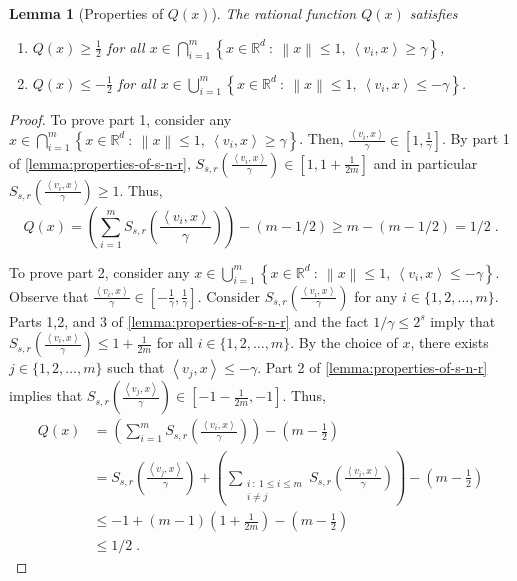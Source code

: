 \documentclass[12pt]{article}
\newtheorem{lemma}[definition]{Lemma}
\newcommand{\R}{\mathbb{R}}  %
\newcommand{\ip}[2]{\left\langle #1, #2 \right\rangle} %
\newcommand{\norm}[1]{\left\| #1 \right\|}  %
\begin{document}
\begin{lemma}[Properties of $Q(x)$]
\label{lemma:properties-of-q}
The rational function $Q(x)$ satisfies
\begin{enumerate}
\item $Q(x) \ge \frac{1}{2}$ for all $\displaystyle x \in \bigcap_{i=1}^m \left\{ x \in \R^d ~:~ \norm{x} \le 1, \ \ip{v_i}{x} \ge \gamma \right\}$,
\item $Q(x) \le -\frac{1}{2}$ for all $\displaystyle x \in \bigcup_{i=1}^m \left\{ x \in \R^d ~:~ \norm{x} \le 1, \ \ip{v_i}{x} \le - \gamma \right\}$.
\end{enumerate}
\end{lemma}

\begin{proof}
To prove part 1, consider any $x \in \bigcap_{i=1}^m \left\{ x \in \R^d ~:~ \norm{x} \le 1, \
\ip{v_i}{x} \ge \gamma \right\}$. Then, $\frac{\ip{v_i}{x}}{\gamma} \in [1,
\frac{1}{\gamma}]$. By part 1 of \autoref{lemma:properties-of-s-n-r},
$S_{s,r}\left(\frac{\ip{v_i}{x}}{\gamma}\right) \in [1, 1 + \frac{1}{2m}]$ and
in particular $S_{s,r}\left(\frac{\ip{v_i}{x}}{\gamma}\right) \ge 1$. Thus,
$$
Q(x) = \left( \sum_{i=1}^m S_{s,r}\left(\frac{\ip{v_i}{x}}{\gamma}\right) \right) - (m - 1/2) \ge m - (m - 1/2) = 1/2 \; .
$$

To prove part 2, consider any $x \in \bigcup_{i=1}^m \left\{ x \in \R^d ~:~
\norm{x} \le 1, \ \ip{v_i}{x} \le - \gamma \right\}$. Observe that
$\frac{\ip{v_i}{x}}{\gamma} \in [-\frac{1}{\gamma}, \frac{1}{\gamma}]$. Consider
$S_{s,r}\left(\frac{\ip{v_i}{x}}{\gamma}\right)$ for any $i \in
\{1,2,\dots,m\}$. Parts 1,2, and 3 of \autoref{lemma:properties-of-s-n-r}
and the fact $1/\gamma \le 2^s$ imply that
$S_{s,r}\left(\frac{\ip{v_i}{x}}{\gamma}\right) \le 1 +
\frac{1}{2m}$ for all $i \in \{1,2,\dots,m\}$. By the choice of $x$, there
exists $j \in \{1,2,\dots,m\}$ such that $\ip{v_j}{x} \le - \gamma$. Part 2 of
\autoref{lemma:properties-of-s-n-r} implies that
$S_{s,r}\left(\frac{\ip{v_j}{x}}{\gamma}\right) \in [-1-\frac{1}{2m},-1]$. Thus,
\begin{align*}
Q(x)
& = \left( \sum_{i=1}^m S_{s,r}\left( \frac{\ip{v_i}{x}}{\gamma} \right) \right) - \left(m - \frac{1}{2} \right) \\
& = S_{s,r}\left( \frac{\ip{v_j}{x}}{\gamma} \right) + \left( \sum_{\substack{i ~:~ 1 \le i \le m \\ i \neq j}} S_{s,r}\left( \frac{\ip{v_i}{x}}{\gamma} \right) \right) - \left(m - \frac{1}{2} \right) \\
& \le -1 + (m-1) \left( 1 + \frac{1}{2m} \right) - \left(m - \frac{1}{2} \right) \\
& \le 1/2 \; .
\end{align*}
\end{proof}
\end{document}

